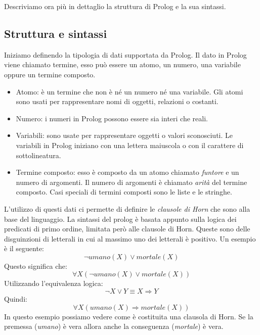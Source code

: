 Descriviamo ora più in dettaglio la struttura di Prolog e la sua sintassi.



\subsection{Struttura e sintassi}
\label{subsec:sintassi}
Iniziamo definendo la tipologia di dati supportata da Prolog.
Il dato in Prolog viene chiamato termine, esso può essere un atomo, un numero, una variabile oppure un termine composto.
\begin{itemize}
    \item Atomo: è un termine che non è né un numero né una variabile. Gli atomi sono usati per rappresentare nomi di oggetti, relazioni o costanti.
    \item Numero: i numeri in Prolog possono essere sia interi che reali.
    \item Variabili: sono usate per rappresentare oggetti o valori sconosciuti. Le variabili in Prolog iniziano con una lettera maiuscola o con il carattere di sottolineatura.
    \item Termine composto: esso è composto da un atomo chiamato \textit{funtore} e un numero di argomenti. Il numero di argomenti è chiamato \textit{arità} del termine composto.
          Casi speciali di termini composti sono le liste  e le stringhe.
\end{itemize} 
L'utilizzo di questi dati ci permette di definire le \textit{clausole di Horn} \cite{horn1951sentences} che sono alla base del linguaggio.
La sintassi del prolog è basata appunto sulla logica dei predicati di primo ordine, limitata però alle clausole di Horn.
Queste sono delle disguinzioni di letterali in cui al massimo uno dei letterali è positivo. Un esempio è il seguente:
\begin{equation}
    \label{eq:clausolaHorn1}
    \neg umano(X) \lor mortale(X)
\end{equation}
Questo significa che:
\begin{equation}
    \label{eq:clausolaHorn2}
    \forall X ( \neg umano(X) \lor mortale(X) )
\end{equation}
Utilizzando l'equivalenza logica:
\begin{equation}
    \label{eq:clausolaHorn3}
    \neg X \lor Y \equiv X \Rightarrow Y
\end{equation}
Quindi:
\begin{equation}
    \label{eq:clausolaHorn4}
    \forall X ( umano(X) \Rightarrow mortale(X))
\end{equation}
In questo esempio possiamo vedere come è costituita una clausola di Horn. Se la premessa (\textit{umano}) è vera allora
anche la conseguenza (\textit{mortale}) è vera.

